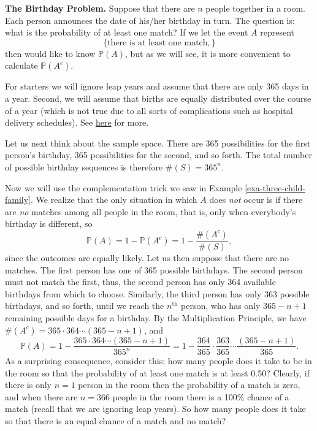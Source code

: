 \documentclass[captions=tableheading]{scrbook}
\begin{document}
\begin{example}
\textbf{The Birthday Problem.} Suppose that there are \(n\) people together in a room. Each person announces the date of his/her birthday in turn. The question is: what is the probability of at least one match? If we let the event \(A\) represent 
\[
\{ \mbox{there is at least one match}, \}
\]
then would like to know \(\mathbb{P}(A)\), but as we will see, it is more convenient to calculate \(\mathbb{P}(A^{c})\).

For starters we will ignore leap years and assume that there are only 365 days in a year. Second, we will assume that births are equally distributed over the course of a year (which is not true due to all sorts of complications such as hospital delivery schedules). See \href{http://en.wikipedia.org/wiki/Birthday_problem}{here} for more.

Let us next think about the sample space. There are 365 possibilities for the first person's birthday, 365 possibilities for the second, and so forth. The total number of possible birthday sequences is therefore \(\#(S)=365^{n}\).

Now we will use the complementation trick we saw in Example \ref{exa-three-child-family}. We realize that the only situation in which \(A\) does \emph{not} occur is if there are \emph{no} matches among all people in the room, that is, only when everybody's birthday is different, so
\[
\mathbb{P}(A)=1-\mathbb{P}(A^{c})=1-\frac{\#(A^{c})}{\#(S)},
\]
since the outcomes are equally likely. Let us then suppose that there are no matches. The first person has one of 365 possible birthdays. The second person must not match the first, thus, the second person has only 364 available birthdays from which to choose. Similarly, the third person has only 363 possible birthdays, and so forth, until we reach the \(n^{\mathrm{th}}\) person, who has only \(365-n+1\) remaining possible days for a birthday. By the Multiplication Principle, we have \(\#(A^{c})=365\cdot364\cdots(365-n+1)\), and
\begin{equation}
\mathbb{P}(A)=1-\frac{365\cdot364\cdots(365-n+1)}{365^{n}}=1-\frac{364}{365}\cdot\frac{363}{365}\cdots\frac{(365-n+1)}{365}.
\end{equation}
As a surprising consequence, consider this: how many people does it take to be in the room so that the probability of at least one match is at least 0.50? Clearly, if there is only \(n=1\) person in the room then the probability of a match is zero, and when there are \(n=366\) people in the room there is a 100\% chance of a match (recall that we are ignoring leap years). So how many people does it take so that there is an equal chance of a match and no match?


\end{example}
\end{document}

